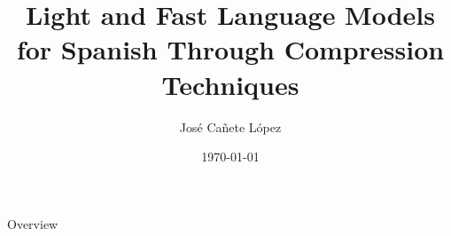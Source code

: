 \documentclass[aspectratio=169,xcolor=dvipsnames]{beamer}
\title[ALBETO and Speedy Gonzales]{Light and Fast Language Models for Spanish Through Compression Techniques} %
\author[Pin-Yen] {José Cañete López}
\institute[NTU] %
{
    Supervisor: Felipe Bravo-Marquez \\
    Department of Computer Science \\
    Universidad de Chile %
}
\date{\today} %
\begin{document}
\begin{frame}
    \titlepage
\end{frame}

\begin{frame}{Overview}
    \tableofcontents
\end{frame}







\end{document}
